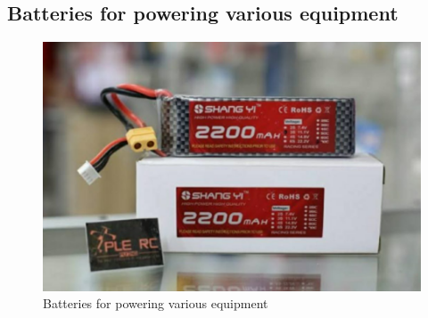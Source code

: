 \subsection{Batteries for powering various equipment}
\begin{figure}[H]
\centering
\includegraphics[width=0.5\columnwidth]{figs/battery.png}
\caption{Batteries for powering various equipment}
\end{figure}

